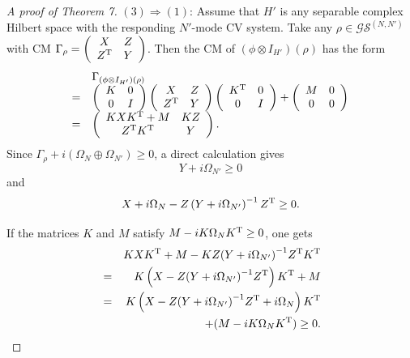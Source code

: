 \documentclass[10pt,aps,pra,amsfonts,amssymb,amsmath,%
floatfix,nofootinbib, groupedaddress,superscriptaddress,citesort,twocolumn
]{revtex4}%
\begin{document}
\begin{proof}[A proof of Theorem 7]
	$\left( 3 \right) \Rightarrow \left( 1 \right)$:
	Assume that $H'$ is  any  separable complex Hilbert space with the responding $N'$-mode CV system.
	Take any  $\rho  \in  \mathcal {GS}^{\left( N, N'\right)}$ with  CM
	$
	{\Gamma _\rho } = \left( {\begin{array}{*{20}{c}}
			X&Z\\
			{{Z^{\rm T}}}&Y
	\end{array}} \right)$.
	Then
	the CM of $\left( {\phi  \otimes  I_{H'}} \right)(\rho)$ has the form
		\begin{eqnarray}\label{one}
	\begin{array}{rl}
		&{\Gamma _{\left( {\phi  \otimes  I_{H'}} \right)(\rho )}}\\
		=& \left( {\begin{array}{*{20}{c}}
				K&{0}\\
				{0}&I
		\end{array}} \right)\left( {\begin{array}{*{20}{c}}
				X&Z\\
				{{Z^{\rm T}}}&Y
		\end{array}} \right)\left( {\begin{array}{*{20}{c}}
				{{K^{\rm T}}}&{0}\\
				{0}&I
		\end{array}} \right) + \left( {\begin{array}{*{20}{c}}
				M&{0}\\
				{0}&0
		\end{array}} \right)\\
		= &\left( {\begin{array}{*{20}{c}}
				{KX{K^{\rm T}} + M}&{KZ}\\
				{{Z^{\rm T}}{K^{\rm T}}}&Y
		\end{array}} \right).
	\end{array}
		\end{eqnarray}
	Since    $\Gamma _\rho+i({\Omega _N} \oplus {\Omega _{N'}})\ge 0$, a direct calculation gives
	$${Y + i{\Omega _{N'}} \ge 0}$$and
	$$	{X + i{\Omega _N} - Z\left( {Y + i{\Omega _{N'}}} \right)^{-1}{Z^{\rm T}} \ge 0}.$$

	If the matrices  $ K$ and $M $ satisfy  $M-iK \Omega_N K^{\rm T} \ge 0$, one gets
		\begin{eqnarray*}\label{666}
			&&	KX{K^{\rm T}} + M - KZ{\left( {Y + i{\Omega _{N'}}} \right)^{ - 1}}{Z^{\rm T}}{K^{\rm T}}\\
			&=& K\left( {X - Z{{\left( {Y + i{\Omega _{N'}}} \right)}^{ - 1}}{Z^{\rm T}}} \right){K^{\rm T}} + M\\
			&=& K\left({X - Z{{\left( {Y + i{\Omega _{N'}}} \right)}^{ - 1}}{Z^{\rm T}}}
			+ i{\Omega _N} \right){K^{\rm T}} \\
			&&	+ (M - iK{\Omega _N}{K^{\rm T}} )\ge0.
		\end{eqnarray*}
	

\end{proof}
\end{document}
